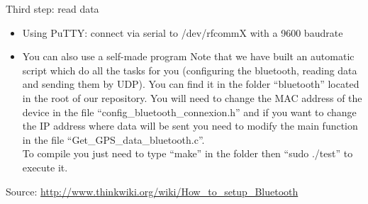 Third step: read data\\
\begin{itemize}
  \item Using PuTTY: connect via serial to /dev/rfcommX with a 9600 baudrate
  \item You can also use a self-made program
Note that we have built an automatic script which do all the tasks for you (configuring the bluetooth, reading data and sending them by UDP). You can find it in the folder “bluetooth” located in the root of our repository. You will need to change the MAC address of the device in the file “config\_bluetooth\_connexion.h” and if you want to change the IP address where data will be sent you need to modify the main function in the file “Get\_GPS\_data\_bluetooth.c”.\\
To compile you just need to type “make” in the folder then “sudo ./test” to execute it.
\end{itemize}

Source: \url{http://www.thinkwiki.org/wiki/How\_to\_setup\_Bluetooth}
